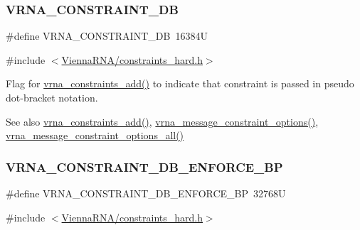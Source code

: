 \subsubsection{\texorpdfstring{V\+R\+N\+A\+\_\+\+C\+O\+N\+S\+T\+R\+A\+I\+N\+T\+\_\+\+DB}{VRNA\_CONSTRAINT\_DB}}
{\footnotesize\ttfamily \#define V\+R\+N\+A\+\_\+\+C\+O\+N\+S\+T\+R\+A\+I\+N\+T\+\_\+\+DB~16384U}



{\ttfamily \#include $<$\hyperlink{constraints__hard_8h}{Vienna\+R\+N\+A/constraints\+\_\+hard.\+h}$>$}



Flag for \hyperlink{group__constraints_ga35a401f680969a556858a8dd5f1d07cc}{vrna\+\_\+constraints\+\_\+add()} to indicate that constraint is passed in pseudo dot-\/bracket notation. 

\begin{DoxySeeAlso}{See also}
\hyperlink{group__constraints_ga35a401f680969a556858a8dd5f1d07cc}{vrna\+\_\+constraints\+\_\+add()}, \hyperlink{group__constraints_gaa1f20b53bf09ac2e6b0dbb13f7d89670}{vrna\+\_\+message\+\_\+constraint\+\_\+options()}, \hyperlink{group__constraints_gaec7e13fa0465c2acc7a621d1aecb709f}{vrna\+\_\+message\+\_\+constraint\+\_\+options\+\_\+all()} 
\end{DoxySeeAlso}
\mbox{\label{group__hard__constraints_ga29ebe940110d60ab798fdacbcdbbfb7d}} 
\subsubsection{\texorpdfstring{V\+R\+N\+A\+\_\+\+C\+O\+N\+S\+T\+R\+A\+I\+N\+T\+\_\+\+D\+B\+\_\+\+E\+N\+F\+O\+R\+C\+E\+\_\+\+BP}{VRNA\_CONSTRAINT\_DB\_ENFORCE\_BP}}
{\footnotesize\ttfamily \#define V\+R\+N\+A\+\_\+\+C\+O\+N\+S\+T\+R\+A\+I\+N\+T\+\_\+\+D\+B\+\_\+\+E\+N\+F\+O\+R\+C\+E\+\_\+\+BP~32768U}



{\ttfamily \#include $<$\hyperlink{constraints__hard_8h}{Vienna\+R\+N\+A/constraints\+\_\+hard.\+h}$>$}



